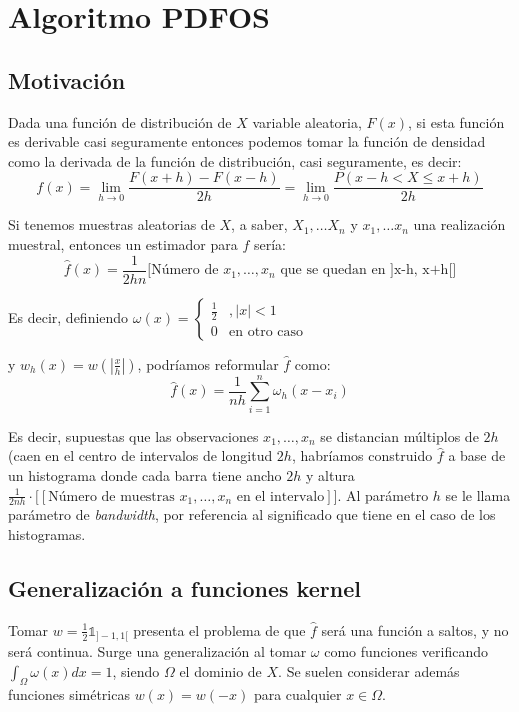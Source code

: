 \section{Algoritmo PDFOS}
\subsection{Motivación}
Dada una función de distribución de $X$ variable aleatoria, $F(x)$, si esta función es derivable casi seguramente entonces
podemos tomar la función de densidad como la derivada de la función de distribución, casi seguramente, es decir:
\[f(x) = \lim_{h\rightarrow 0} \frac{F(x+h) - F(x-h)}{2h} = \lim_{h\rightarrow 0} \frac{P(x-h < X \le x+h)}{2h}\]

Si tenemos muestras aleatorias de $X$, a saber, $X_1, \ldots X_n$ y $x_1, \ldots x_n$ una realización muestral, entonces un 
estimador para $f$ sería:
\[\widehat{f}(x) = \frac{1}{2hn} \bigg[\textrm{Número de } x_1, \ldots, x_n \textrm{ que se quedan en ]x-h, x+h[}\bigg]\]

Es decir, definiendo $\omega(x) = \left\{\begin{array}{ll} 
                                \frac{1}{2} &, |x| < 1\\
                                0 & \textrm{en otro caso}
                                \end{array}\right.$
                                
                                
y $w_h(x) = w\left(\left|\frac{x}{h}\right|\right)$, podríamos reformular $\widehat{f}$ como:
\[\widehat{f}(x) = \frac{1}{nh} \sum_{i=1}^n \omega_h(x-x_i)\]

Es decir, supuestas que las observaciones $x_1, \ldots, x_n$ se distancian múltiplos de $2h$ (caen en el centro de intervalos
de longitud $2h$, habríamos construido $\widehat{f}$ a base de un histograma donde cada barra tiene ancho $2h$ y altura 
$\frac{1}{2nh} \cdot \bigg[[\textrm{Número de muestras } x_1, \ldots, x_n \textrm{ en el intervalo}]\bigg]$. Al parámetro $h$
se le llama parámetro de \textit{bandwidth}, por referencia al significado que tiene en el caso de los histogramas.

\subsection{Generalización a funciones kernel}
Tomar $w = \frac{1}{2} \mathds{1}_{]-1,1[}$ presenta el problema de que $\widehat{f}$ será una función a saltos, y no
será continua. Surge una generalización al tomar $\omega$ como funciones verificando $\int_{\Omega} \omega(x) dx = 1$, 
siendo $\Omega$ el dominio de $X$. Se suelen considerar además funciones simétricas $w(x) = w(-x)$ para cualquier 
$x\in \Omega$.

